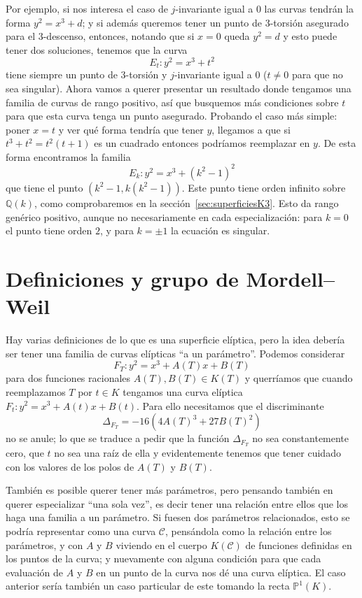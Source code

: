 \documentclass[a4paper]{book}
\theoremstyle{definition}
\theoremstyle{plain}
\newcommand{\QQ}{\mathbb{Q}}
\newcommand{\PP}{\mathbb{P}}
\newcommand{\cc}{\mathcal{C}}
\begin{document}
Por ejemplo, si nos interesa el caso de $j$-invariante igual a 0 las curvas tendrán la forma $y^2=x^3+d$; y si además queremos tener un punto de 3-torsión asegurado para el 3-descenso, entonces, notando que si $x=0$ queda $y^2 = d$ y esto puede tener dos soluciones, tenemos que la curva 
\[
E_t: y^2 = x^3 + t^2
\]
tiene siempre un punto de 3-torsión y $j$-invariante igual a 0 ($t\neq 0$ para que no sea singular). Ahora vamos a querer presentar un resultado donde tengamos una familia de curvas de rango positivo, así que busquemos más condiciones sobre $t$ para que esta curva tenga un punto asegurado. Probando el caso más simple: poner $x=t$ y ver qué forma tendría que tener $y$, llegamos a que si $t^3+t^2 = t^2(t+1)$ es un cuadrado entonces podríamos reemplazar en $y$. De esta forma encontramos la familia
\[
E_k : y^2 = x^3 + {(k^2-1)}^2
\]
que tiene el punto $(k^2-1 , k(k^2-1))$. Este punto tiene orden infinito sobre $\QQ(k)$, como comprobaremos en la sección~\ref{sec:superficiesK3}. Esto da rango genérico positivo, aunque no necesariamente en cada especialización: para $k=0$ el punto tiene orden $2$, y para $k=\pm1$ la ecuación es singular.

\section{Definiciones y grupo de Mordell--Weil}

Hay varias definiciones de lo que es una superficie elíptica, pero la idea debería ser tener una familia de curvas elípticas ``a un parámetro''. Podemos considerar
\[
F_T:y^2 = x^3 +A(T)x + B(T)
\]
para dos funciones racionales $A(T), B(T) \in K(T)$ y querríamos que cuando reemplazamos $T$ por $t\in K$ tengamos una curva elíptica $F_t:y^2 = x^3 +A(t)x + B(t)$. Para ello necesitamos que el discriminante 
\[
\Delta_{F_T} = -16(4{A(T)}^3+27{B(T)}^2)
\]
no se anule; lo que se traduce a pedir que la función $\Delta_{F_T}$ no sea constantemente cero, que $t$ no sea una raíz de ella y evidentemente tenemos que tener cuidado con los valores de los polos de $A(T)$ y $B(T)$.

También es posible querer tener más parámetros, pero pensando también en querer especializar ``una sola vez'', es decir tener una relación entre ellos que los haga una familia a un parámetro. Si fuesen dos parámetros relacionados, esto se podría representar como una curva $\cc$, pensándola como la relación entre los parámetros, y con $A$ y $B$ viviendo en el cuerpo $K(\cc)$ de funciones definidas en los puntos de la curva; y nuevamente con alguna condición para que cada evaluación de $A$ y $B$ en un punto de la curva nos dé una curva elíptica. El caso anterior sería también un caso particular de este tomando la recta $\PP^1(K)$.
\end{document}
